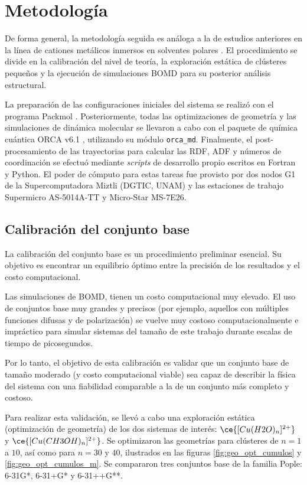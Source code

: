 \chapter{Metodología}

De forma general, la metodología seguida es análoga a la de estudios anteriores en la línea de cationes metálicos inmersos en solventes polares \cite{CILP-2018-02, CILP-2019-01, CILP-2023-01, CILP-2024-01}. El procedimiento se divide en la calibración del nivel de teoría, la exploración estática de clústeres pequeños y la ejecución de simulaciones BOMD para su posterior análisis estructural.

La preparación de las configuraciones iniciales del sistema se realizó con el programa Packmol \cite{packmol}. Posteriormente, todas las optimizaciones de geometría y las simulaciones de dinámica molecular se llevaron a cabo con el paquete de química cuántica ORCA v6.1 \cite{orca}, utilizando su módulo \texttt{orca\_md}. Finalmente, el post-procesamiento de las trayectorias para calcular las RDF, ADF y números de coordinación se efectuó mediante \textit{scripts} de desarrollo propio escritos en Fortran y Python. El poder de cómputo para estas tareas fue provisto por dos nodos G1 de la Supercomputadora Miztli (DGTIC, UNAM) y las estaciones de trabajo Supermicro AS-5014A-TT y Micro-Star MS-7E26.

\section{Calibración del conjunto base}

La calibración del conjunto base es un procedimiento preliminar esencial. Su objetivo es encontrar un equilibrio óptimo entre la precisión de los resultados y el costo computacional.

Las simulaciones de BOMD, tienen un costo computacional muy elevado. El uso de conjuntos base muy grandes y precisos (por ejemplo, aquellos con múltiples funciones difusas y de polarización) se vuelve muy costoso computacionalmente e impráctico para simular sistemas del tamaño de este trabajo durante escalas de tiempo de picosegundos.

Por lo tanto, el objetivo de esta calibración es validar que un conjunto base de tamaño moderado (y costo computacional viable) sea capaz de describir la física del sistema con una fiabilidad comparable a la de un conjunto más completo y costoso.

Para realizar esta validación, se llevó a cabo una exploración estática (optimización de geometría) de los dos sistemas de interés: $\ce{[Cu(H2O)_{n}]^{2+}}$ y $\ce{[Cu(CH3OH)_{n}]^{2+}}$. Se optimizaron las geometrías para clústeres de $n = 1$ a $10$, así como para $n = 30$ y $40$, ilustrados en las figuras \ref{fig:geo_opt_cumulos} y \ref{fig:geo_opt_cumulos_m}. Se compararon tres conjuntos base de la familia Pople: 6-31G*, 6-31+G* y 6-31++G**. 

